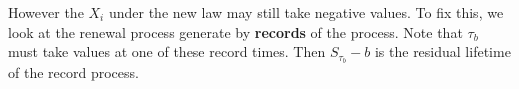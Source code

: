 \documentclass[12pt]{article}
\begin{document}
However the $X_i$ under the new law may still take negative values. To fix this, we look at the renewal process generate by \textbf{records} of the process. Note that $\tau_b$ must take values at one of these record times. Then $S_{\tau_b} - b$ is the residual lifetime of the record process.






\end{document}
